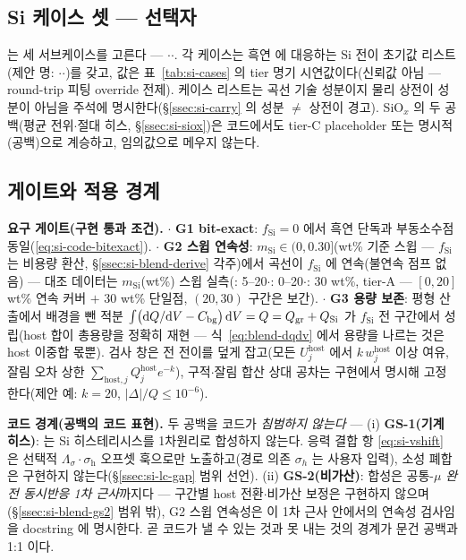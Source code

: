 \subsection{Si 케이스 셋 ---  선택자}\label{ssec:code-caseset}
 는 세 서브케이스를 고른다 --- $\cdot$$\cdot$.
각 케이스는 흑연  에 대응하는 Si 전이 초기값 리스트(제안 명:
$\cdot$$\cdot$)를 갖고, 값은 표~\ref{tab:si-cases}
의 tier 명기 시연값이다(신뢰값 아님 --- round-trip 피팅 override 전제). 케이스 리스트는 곡선 기술
성분이지 물리 상전이 성분이 아님을 주석에 명시한다(\S\ref{ssec:si-carry} 의 성분 $\ne$ 상전이 경고).
SiO$_x$ 의 두 공백(평균 전위$\cdot$절대 히스, \S\ref{ssec:si-siox})은 코드에서도 tier-C placeholder
또는 명시적 (공백)으로 계승하고, 임의값으로 메우지 않는다.

\subsection{게이트와 적용 경계}\label{ssec:code-gates}
\begin{codebox}
\textbf{요구 게이트(구현 통과 조건).}
$\cdot$ \textbf{G1 bit-exact}: $f_\mathrm{Si}{=}0$ 에서 흑연 단독과 부동소수점 동일(\eqref{eq:si-code-bitexact}).
$\cdot$ \textbf{G2 스윕 연속성}: $m_\mathrm{Si}\in(0,0.30]$(wt\% 기준 스윕 --- $f_\mathrm{Si}$ 는 비용량 환산, \S\ref{ssec:si-blend-derive} 각주)에서 곡선이 $f_\mathrm{Si}$ 에 연속(불연속 점프 없음)
--- 대조 데이터는 $m_\mathrm{Si}$(wt\%) 스윕 실측(\cite{gautam_blend2024}: 5--20$\cdot$\cite{moyassari_blend2022}: 0--20$\cdot$\cite{chatzogiannakis_blend2025}: 30 wt\%, tier-A --- $[0,20]$ wt\% 연속 커버 $+$ 30 wt\% 단일점, $(20,30)$ 구간은 보간).
$\cdot$ \textbf{G3 용량 보존}: 평형 산출에서 배경을 뺀 적분
$\int\bigl(\mathrm{d} Q/\mathrm{d} V-C_{\mathrm{bg}}\bigr)\,\mathrm{d} V=Q=Q_\mathrm{gr}+Q_\mathrm{Si}$ 가 $f_\mathrm{Si}$
전 구간에서 성립(host 합이 총용량을 정확히 재현 --- 식~\eqref{eq:blend-dqdv} 에서 용량을 나르는 것은
host 이중합 몫뿐). 검사 창은 전 전이를 덮게 잡고(모든 $U_j^\mathrm{host}$ 에서 $k\,w_j^\mathrm{host}$
이상 여유, 잘림 오차 상한 $\sum_{\mathrm{host},j}Q_j^\mathrm{host}e^{-k}$), 구적$\cdot$잘림 합산 상대
공차는 구현에서 명시해 고정한다(제안 예: $k{=}20$, $|\Delta|/Q\le10^{-6}$).
\end{codebox}

\begin{warnbox}
\textbf{코드 경계(공백의 코드 표현).} 두 공백을 코드가 \emph{침범하지 않는다} --- (i) \textbf{GS-1(기계
히스)}:  는 Si 히스테리시스를 1차원리로 합성하지 않는다. 응력 결합 항
\eqref{eq:si-vshift} 은 선택적 $\Lambda_\sigma\!\cdot\!\sigma_\mathrm{h}$ 오프셋 훅으로만 노출하고(경로 의존 $\sigma_h$
는 사용자 입력), 소성 폐합은 구현하지 않는다(\S\ref{ssec:si-lc-gap} 범위 선언). (ii) \textbf{GS-2(비가산)}:
합성은 공통-$\mu$ \emph{완전 동시반응 1차 근사}까지다 --- 구간별 host 전환$\cdot$비가산 보정은 구현하지
않으며(\S\ref{ssec:si-blend-gs2} 범위 밖), G2 스윕 연속성은 이 1차 근사 안에서의 연속성 검사임을 docstring
에 명시한다. 곧 코드가 낼 수 있는 것과 못 내는 것의 경계가 문건 공백과 1:1 이다.
\end{warnbox}

